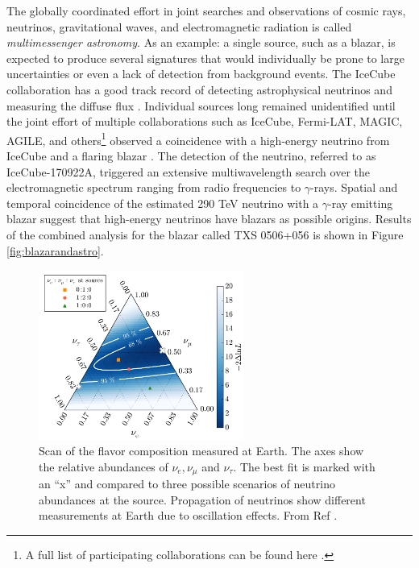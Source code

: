 The globally coordinated effort in joint searches and observations of cosmic rays, neutrinos, gravitational waves, and electromagnetic radiation is called \textit{multimessenger astronomy}. As an example: a single source, such as a blazar, is expected to produce several signatures that would individually be prone to large uncertainties or even a lack of detection from background events. The IceCube collaboration has a good track record of detecting astrophysical neutrinos and measuring the diffuse flux \cite{Klein:2018fnn,Aartsen:2017mau}. Individual sources long remained unidentified until the joint effort of multiple collaborations such as IceCube, Fermi-LAT, MAGIC, AGILE, and others\footnote{A full list of participating collaborations can be found here \cite{IceCube:2018dnn}.} observed a coincidence with a high-energy neutrino from IceCube and a flaring blazar \cite{IceCube:2018dnn}. The detection of the neutrino, referred to as IceCube-170922A, triggered an extensive multiwavelength search over the electromagnetic spectrum ranging from radio frequencies to $\gamma$-rays. Spatial and temporal coincidence of the estimated 290 TeV neutrino with a $\gamma$-ray emitting blazar suggest that high-energy neutrinos have blazars as possible origins. Results of the combined analysis for the blazar called TXS 0506+056 is shown in Figure \ref{fig:blazarandastro}. 

\begin{figure}[t]
\centering
\includegraphics[width=0.6\textwidth]{chapter5/img/FlavorTriangle.png}
\caption{Scan of the flavor composition measured at Earth. The axes show the relative abundances of $\nu_e, \nu_\mu$ and $\nu_\tau$. The best fit is marked with an ``x'' and compared to three possible scenarios of neutrino abundances at the source. Propagation of neutrinos show different measurements at Earth due to oscillation effects. From Ref \cite{Aartsen:2015knd}.}
\label{fig:triangle}
\end{figure}

